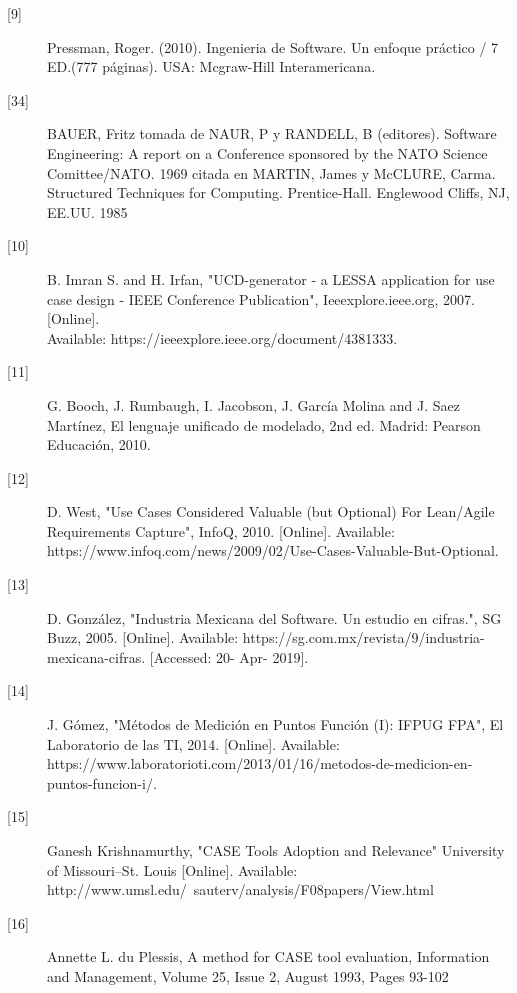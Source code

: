 \begin{description}
		\item[\hypertarget{b09}{[9]}] Pressman, Roger. (2010). Ingenieria de Software. Un enfoque práctico / 7 ED.(777 páginas). USA: Mcgraw-Hill Interamericana.
		
		\item[\hypertarget{b34}{[34]}] BAUER, Fritz tomada de NAUR, P y RANDELL, B (editores). Software Engineering: A report on a Conference sponsored by the NATO Science Comittee/NATO. 1969 citada en MARTIN, James y McCLURE, Carma. Structured
		Techniques for Computing. Prentice-Hall. Englewood Cliffs, NJ, EE.UU. 1985 
		
		\item[\hypertarget{b10}{[10]}] B. Imran S. and H. Irfan, "UCD-generator - a LESSA application for use case design - IEEE Conference Publication", Ieeexplore.ieee.org, 2007. [Online]. \\Available: https://ieeexplore.ieee.org/document/4381333.
		
		\item[\hypertarget{b11}{[11]}] G. Booch, J. Rumbaugh, I. Jacobson, J. García Molina and J. Saez Martínez, El lenguaje unificado de modelado, 2nd ed. Madrid: Pearson Educación, 2010.
		
		\item[\hypertarget{b12}{[12]}] D. West, "Use Cases Considered Valuable (but Optional) For Lean/Agile Requirements Capture", InfoQ, 2010. [Online]. Available: https://www.infoq.com/news/2009/02/Use-Cases-Valuable-But-Optional. 
		
		\item[\hypertarget{b13}{[13]}] D. González, "Industria Mexicana del Software. Un estudio en cifras.", SG Buzz, 2005. [Online]. Available: https://sg.com.mx/revista/9/industria-mexicana-cifras. [Accessed: 20- Apr- 2019].
		
		\item[\hypertarget{b14}{[14]}] J. Gómez, "Métodos de Medición en Puntos Función (I): IFPUG FPA", El Laboratorio de las TI, 2014. [Online]. Available: https://www.laboratorioti.com/2013/01/16/metodos-de-medicion-en-puntos-funcion-i/. 
		
		\item[\hypertarget{b15}{[15]}] Ganesh Krishnamurthy, "CASE Tools 
		Adoption and Relevance" University of Missouri–St. Louis [Online]. Available: http://www.umsl.edu/~sauterv/analysis/F08papers/View.html
		
		\item[\hypertarget{b16}{[16]}] Annette L. du Plessis, A method for CASE tool evaluation, Information and Management, Volume 25, Issue 2, August 1993, Pages 93-102
		

\end{description}
